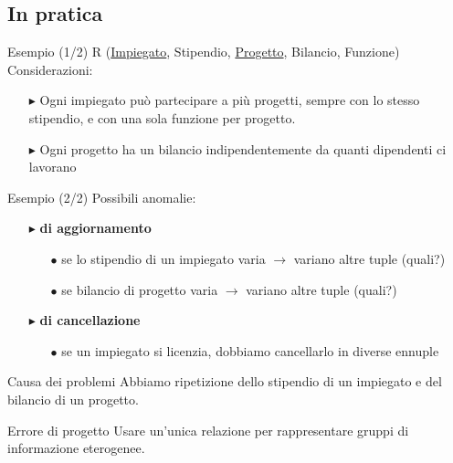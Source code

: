 \documentclass{beamer}
\begin{document}
\subsection{In pratica}
\begin{frame}{Esempio (1/2)}
    \Large R (\underline{Impiegato}, Stipendio, \underline{Progetto}, Bilancio, Funzione)
    \vfill
    \normalsize Considerazioni:
    \begin{itemize}
        \item[$\blacktriangleright$] Ogni impiegato può partecipare a più progetti, sempre con lo stesso stipendio, e con una sola funzione per progetto.
        \item[$\blacktriangleright$] Ogni progetto ha un bilancio indipendentemente da quanti dipendenti ci lavorano 
    \end{itemize}
    

\end{frame}
\begin{frame}{Esempio (2/2)}
    \normalsize Possibili anomalie:
    \begin{itemize}
        \item[$\blacktriangleright$] \textbf{di aggiornamento}
            \begin{itemize}
                \item[$\bullet$] se lo stipendio di un impiegato varia $\rightarrow$ variano altre tuple (quali?)
                \item[$\bullet$] se bilancio di progetto varia $\rightarrow$ variano altre tuple (quali?)
            \end{itemize}
        \item[$\blacktriangleright$] \textbf{di cancellazione}
            \begin{itemize}
                \item[$\bullet$] se un impiegato si licenzia, dobbiamo cancellarlo in diverse ennuple
            \end{itemize}
    \end{itemize}
    
    
    \begin{block}{Causa dei problemi}
        Abbiamo ripetizione dello stipendio di un impiegato e del bilancio di un progetto.
    \end{block}
    
    \begin{alertblock}{Errore di progetto}
        Usare un'unica relazione per rappresentare gruppi di informazione eterogenee.
    \end{alertblock}
    

\end{frame} %
\end{document}
